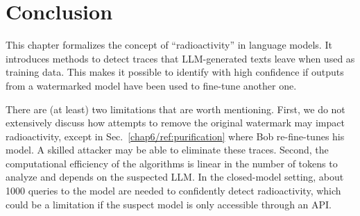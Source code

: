 
\section{Conclusion}

This chapter formalizes the concept of ``radioactivity'' in language models.
It introduces methods to detect traces that LLM-generated texts leave when used as training data.
This makes it possible to identify with high confidence if outputs from a watermarked model have been used to fine-tune another one.

There are (at least) two limitations that are worth mentioning. 
First, we do not extensively discuss how attempts to remove the original watermark may impact radioactivity, except in Sec.~\ref{chap6/ref:purification} where Bob re-fine-tunes his model. 
A skilled attacker may be able to eliminate these traces. 
Second, the computational efficiency of the algorithms is linear in the number of tokens to analyze and depends on the suspected LLM. 
In the closed-model setting, about 1000 queries to the model are needed to confidently detect radioactivity, which could be a limitation if the suspect model is only accessible through an API.







